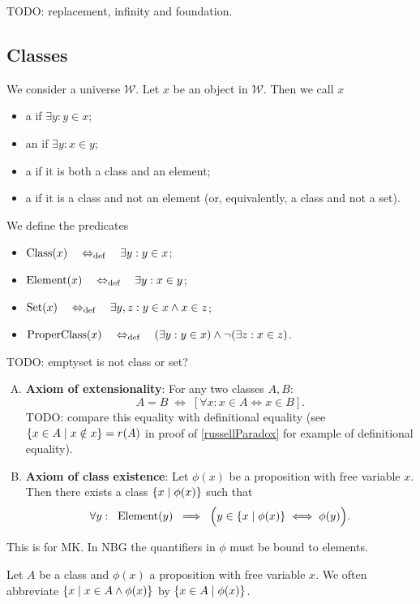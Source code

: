 TODO: replacement, infinity and foundation.

\subsection{Classes}
\begin{definition}
We consider a universe $\mathcal{W}$. Let $x$ be an object in $\mathcal{W}$. Then we call $x$
\begin{itemize}
\item a  if $\exists y: y\in x$;
\item an  if $\exists y: x\in y$;
\item a  if it is both a class and an element;
\item a  if it is a class and not an element (or, equivalently, a class and not a set).
\end{itemize}
We define the predicates
\begin{itemize}
\item $\operatorname{Class}(x) \quad\Leftrightarrow_{\text{def}}\quad \exists y: y\in x$;
\item $\operatorname{Element}(x) \quad\Leftrightarrow_{\text{def}}\quad \exists y: x\in y$;
\item $\operatorname{Set}(x) \quad\Leftrightarrow_{\text{def}}\quad \exists y,z: y\in x \land x\in z$;
\item $\operatorname{ProperClass}(x) \quad\Leftrightarrow_{\text{def}}\quad (\exists y: y \in x)\land \neg (\exists z: x\in z)$.
\end{itemize}
\end{definition}

TODO: emptyset is not class or set?

\begin{enumerate}[(A)]
\item \textbf{Axiom of extensionality}: For any two classes $A,B$:
\[ A=B \;\iff\; \left[\forall x:x\in A\iff x\in B\right]. \]
TODO: compare this equality with definitional equality (see $\setbuilder{x\in A}{ x\notin x } = r(A)$ in proof of \ref{russellParadox} for example of definitional equality).
\item \textbf{Axiom of class existence}: Let $\phi(x)$ be a proposition with free variable $x$. Then there exists a class $\setbuilder{x}{\phi(x)}$ such that
\[ \forall y: \;\; \Element(y) \;\implies\; \Big( y\in \setbuilder{x}{\phi(x)} \iff \phi(y) \Big). \]
\end{enumerate}
This is for MK. In NBG the quantifiers in $\phi$ must be bound to elements.

Let $A$ be a class and $\phi(x)$ a proposition with free variable $x$. We often abbreviate $\setbuilder{x}{x\in A \land \phi(x)}$ by $\setbuilder{x\in A}{\phi(x)}$.


